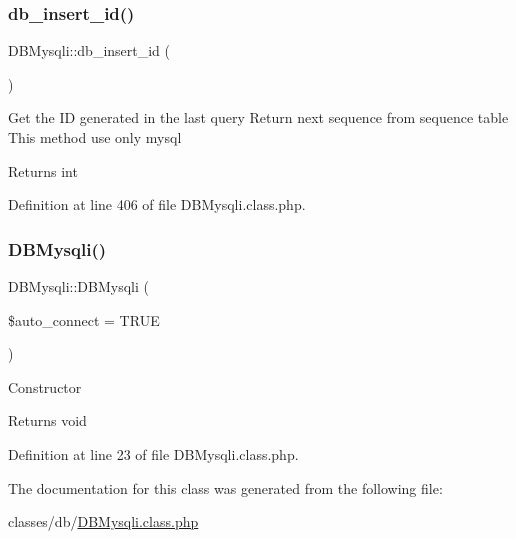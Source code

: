 \subsubsection{\texorpdfstring{db\+\_\+insert\+\_\+id()}{db\_insert\_id()}}
{\footnotesize\ttfamily D\+B\+Mysqli\+::db\+\_\+insert\+\_\+id (\begin{DoxyParamCaption}{ }\end{DoxyParamCaption})}

Get the ID generated in the last query Return next sequence from sequence table This method use only mysql \begin{DoxyReturn}{Returns}
int 
\end{DoxyReturn}


Definition at line 406 of file D\+B\+Mysqli.\+class.\+php.

\mbox{\label{classDBMysqli_ab3cb2172fa087e11c06968914090b71d}} 
\subsubsection{\texorpdfstring{D\+B\+Mysqli()}{DBMysqli()}}
{\footnotesize\ttfamily D\+B\+Mysqli\+::\+D\+B\+Mysqli (\begin{DoxyParamCaption}\item[{}]{\$auto\+\_\+connect = {\ttfamily TRUE} }\end{DoxyParamCaption})}

Constructor \begin{DoxyReturn}{Returns}
void 
\end{DoxyReturn}


Definition at line 23 of file D\+B\+Mysqli.\+class.\+php.



The documentation for this class was generated from the following file\+:\begin{DoxyCompactItemize}
\item 
classes/db/\hyperlink{DBMysqli_8class_8php}{D\+B\+Mysqli.\+class.\+php}\end{DoxyCompactItemize}
